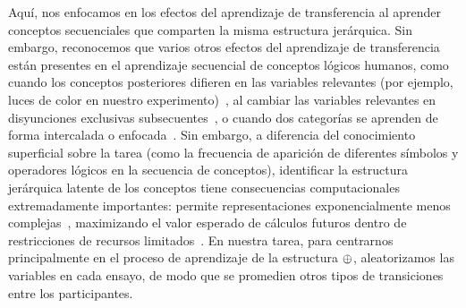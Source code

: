 Aquí, nos enfocamos en los efectos del aprendizaje de transferencia al aprender conceptos secuenciales que comparten la misma estructura jerárquica. Sin embargo, reconocemos que varios otros efectos del aprendizaje de transferencia están presentes en el aprendizaje secuencial de conceptos lógicos humanos, como cuando los conceptos posteriores difieren en las variables relevantes (por ejemplo, luces de color en nuestro experimento)~\cite{blair2009extremely}, al cambiar las variables relevantes  en disyunciones exclusivas subsecuentes~\cite{kruschke1996dimensional}, o cuando dos categorías se aprenden de forma intercalada o enfocada~\cite{carvalho2014putting}. Sin embargo, a diferencia del conocimiento superficial sobre la tarea (como la frecuencia de aparición de diferentes símbolos y operadores lógicos en la secuencia de conceptos), identificar la estructura jerárquica latente de los conceptos tiene consecuencias computacionales extremadamente importantes: permite representaciones exponencialmente menos complejas~\cite{bengio2013representation,lake2015human}, maximizando el valor esperado de cálculos futuros dentro de restricciones de recursos  limitados~\cite{gershman2015computational}. En nuestra tarea, para centrarnos principalmente en el proceso de aprendizaje de la estructura $ \oplus $, aleatorizamos las variables en cada ensayo, de modo que se promedien otros tipos de transiciones entre los participantes.

